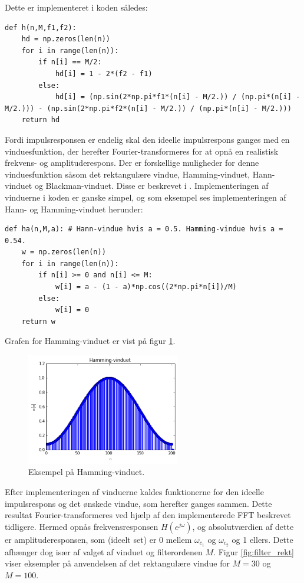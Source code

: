 Dette er implementeret i koden således:
\begin{lstlisting}
def h(n,M,f1,f2):
    hd = np.zeros(len(n))
    for i in range(len(n)):
        if n[i] == M/2:
            hd[i] = 1 - 2*(f2 - f1)
        else:
            hd[i] = (np.sin(2*np.pi*f1*(n[i] - M/2.)) / (np.pi*(n[i] - M/2.))) - (np.sin(2*np.pi*f2*(n[i] - M/2.)) / (np.pi*(n[i] - M/2.)))
    return hd
\end{lstlisting}

Fordi impulsresponsen er endelig skal den ideelle impulsrespons ganges med en vinduesfunktion, der herefter Fourier-transformeres for at opnå en realistisk frekvens- og amplituderespons. Der er forskellige muligheder for denne vinduesfunktion såsom det rektangulære vindue, Hamming-vinduet, Hann-vinduet og Blackman-vinduet. Disse er beskrevet i \cite{side 558-559, DTSP}. Implementeringen af vinduerne i koden er ganske simpel, og som eksempel ses implementeringen af Hann- og Hamming-vinduet herunder:
\begin{lstlisting}
def ha(n,M,a): # Hann-vindue hvis a = 0.5. Hamming-vindue hvis a = 0.54.
    w = np.zeros(len(n))
    for i in range(len(n)):
        if n[i] >= 0 and n[i] <= M:
            w[i] = a - (1 - a)*np.cos((2*np.pi*n[i])/M)
        else:
            w[i] = 0
    return w
\end{lstlisting}

Grafen for Hamming-vinduet er vist på figur \ref{fig:Hamming}.
\begin{figure}[H]
    \centering
    \includegraphics[width = 0.6\textwidth]{figures/Hamming-vindue.PNG}
    \caption{Eksempel på Hamming-vinduet.}
    \label{fig:Hamming}
\end{figure}

Efter implementeringen af vinduerne kaldes funktionerne for den ideelle impulsrespons og det ønskede vindue, som herefter ganges sammen. Dette resultat Fourier-transformeres ved hjælp af den implementerede FFT beskrevet tidligere. Hermed opnås frekvensresponsen $H(e^{j\omega})$, og absolutværdien af dette er amplituderesponsen, som (ideelt set) er 0 mellem $\omega_{c_1}$ og $\omega_{c_2}$ og 1 ellers. Dette afhænger dog især af valget af vinduet og filterordenen $M$. Figur \ref{fig:filter_rekt} viser eksempler på anvendelsen af det rektangulære vindue for $M = 30$ og $M = 100$.

